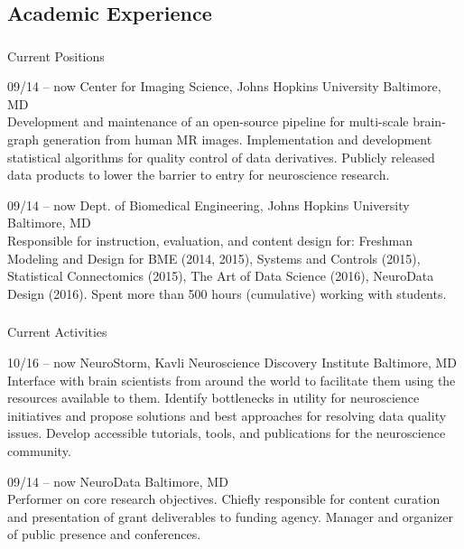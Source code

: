 \documentclass[]{friggeri-cv} %
\begin{document}
\subsection{Academic Experience}

\subsubsection{}{Current Positions}

\begin{entrylist}
\entry
{09/14 -- now}
{Center for Imaging Science, Johns Hopkins University}
{Baltimore, MD}
{\\
Development and maintenance of an open-source pipeline for multi-scale brain-graph generation
from human MR images. Implementation and development statistical algorithms for quality control
of data derivatives. Publicly released data products to lower the barrier to entry for neuroscience
research.}

\entry
{09/14 -- now}
{Dept. of Biomedical Engineering, Johns Hopkins University}
{Baltimore, MD}
{ \\
Responsible for instruction, evaluation, and content design for: Freshman Modeling and Design
for BME (2014, 2015), Systems and Controls (2015), Statistical Connectomics (2015), The Art of
Data Science (2016), NeuroData Design (2016). Spent more than 500 hours (cumulative) working
with students.}
\end{entrylist}

\subsubsection{}{Current Activities}

\begin{entrylist}
\entry
{10/16 -- now}
{NeuroStorm, Kavli Neuroscience Discovery Institute}
{Baltimore, MD}
{\\
Interface with brain scientists from around the world to facilitate them using the resources
available to them. Identify bottlenecks in utility for neuroscience initiatives and propose solutions
and best approaches for resolving data quality issues. Develop accessible tutorials, tools, and publications for the
neuroscience community.
}

\entry
{09/14 -- now}
{NeuroData}
{Baltimore, MD}
{ \\
Performer on core research objectives. Chiefly responsible for content curation and presentation
of grant deliverables to funding agency. Manager and organizer of public presence and conferences.}
\end{entrylist}
\end{document}
